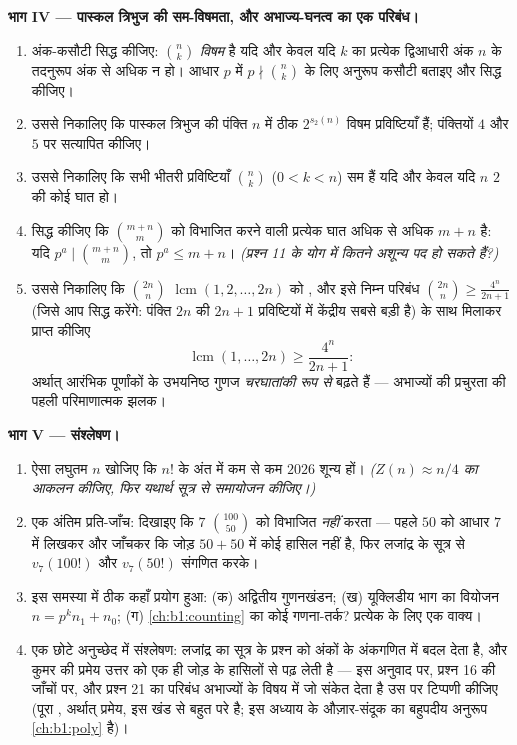 \begin{problem}
\medskip \noindent\textbf{भाग IV --- पास्कल त्रिभुज की सम-विषमता, और
अभाज्य-घनत्व का एक परिबंध।}
\begin{enumerate}[resume]
  \item अंक-कसौटी सिद्ध कीजिए: $\binom nk$ \emph{विषम} है यदि और केवल यदि
  $k$ का प्रत्येक द्विआधारी अंक $n$ के तदनुरूप अंक से अधिक न हो। आधार $p$
  में $p \nmid \binom nk$ के लिए अनुरूप कसौटी बताइए और सिद्ध कीजिए।
  \item उससे निकालिए कि पास्कल त्रिभुज की पंक्ति $n$ में ठीक $2^{s_2(n)}$
  विषम प्रविष्टियाँ हैं; पंक्तियों $4$ और $5$ पर सत्यापित कीजिए।
  \item उससे निकालिए कि सभी भीतरी प्रविष्टियाँ $\binom nk$ ($0 < k < n$) सम
  हैं यदि और केवल यदि $n$ $2$ की कोई घात हो।
  \item सिद्ध कीजिए कि $\binom{m+n}m$ को विभाजित करने वाली प्रत्येक 
  घात अधिक से अधिक $m + n$ है: यदि $p^a \mid \binom{m+n}m$, तो $p^a \leq m +
  n$। \emph{(प्रश्न 11 के योग में कितने अशून्य पद हो सकते हैं?)}
  \item उससे निकालिए कि $\binom{2n}n$ $\operatorname{lcm}(1, 2, \dots, 2n)$
  को , और इसे निम्न परिबंध $\binom{2n}n \geq
  \frac{4^n}{2n+1}$ (जिसे आप सिद्ध करेंगे: पंक्ति $2n$ की $2n + 1$
  प्रविष्टियों में केंद्रीय सबसे बड़ी है) के साथ मिलाकर प्राप्त कीजिए
        \[
        \operatorname{lcm}(1, \dots, 2n) \geq \frac{4^n}{2n+1} :
        \]
        अर्थात् आरंभिक पूर्णांकों के उभयनिष्ठ गुणज \emph{चरघातांकी रूप से}
        बढ़ते हैं --- अभाज्यों की प्रचुरता की पहली परिमाणात्मक झलक।
\end{enumerate}

\medskip \noindent\textbf{भाग V --- संश्लेषण।}
\begin{enumerate}[resume]
  \item ऐसा लघुतम $n$ खोजिए कि $n!$ के अंत में कम से कम $2026$ शून्य हों।
  \emph{($Z(n) \approx n/4$ का आकलन कीजिए, फिर यथार्थ सूत्र से समायोजन
  कीजिए।)}
  \item एक अंतिम प्रति-जाँच: दिखाइए कि $7$ $\binom{100}{50}$ को विभाजित
  \emph{नहीं} करता --- पहले $50$ को आधार $7$ में लिखकर और जाँचकर कि जोड़ $50
  + 50$ में कोई हासिल नहीं है, फिर लजांद्र के सूत्र से $v_7(100!)$ और
  $v_7(50!)$ संगणित करके।
  \item इस समस्या में ठीक कहाँ प्रयोग हुआ: (क) अद्वितीय गुणनखंडन; (ख)
  यूक्लिडीय भाग का वियोजन $n = p^k n_1 + n_0$; (ग) \cref{ch:b1:counting} का
  कोई गणना-तर्क? प्रत्येक के लिए एक वाक्य।
  \item एक छोटे अनुच्छेद में संश्लेषण: लजांद्र का सूत्र  के प्रश्न
  को अंकों के अंकगणित में बदल देता है, और कुमर की प्रमेय उत्तर को एक ही जोड़
  के हासिलों से पढ़ लेती है --- इस अनुवाद पर, प्रश्न 16 की जाँचों पर, और
  प्रश्न 21 का परिबंध अभाज्यों के विषय में जो संकेत देता है उस पर टिप्पणी
  कीजिए (पूरा , अर्थात्  प्रमेय, इस खंड से बहुत परे है; इस
  अध्याय के औज़ार-संदूक का बहुपदीय अनुरूप \cref{ch:b1:poly} है)।
\end{enumerate}
\end{problem}
